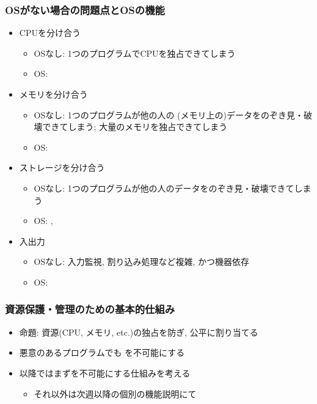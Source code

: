 \documentclass[12pt,dvipdfmx]{beamer}
\begin{document}
\begin{frame}
\frametitle{OSがない場合の問題点とOSの機能}
\begin{itemize}
\item CPUを分け合う
  \begin{itemize}
  \item OSなし: 1つのプログラムでCPUを独占できてしまう
  \item OS: 
  \end{itemize}
\item メモリを分け合う
  \begin{itemize}
  \item OSなし: 1つのプログラムが他の人の
    (メモリ上の)データをのぞき見・破壊できてしまう;
    大量のメモリを独占できてしまう
  \item OS: 
  \end{itemize}
\item ストレージを分け合う
  \begin{itemize}
  \item OSなし: 1つのプログラムが他の人のデータをのぞき見・破壊できてしまう
  \item OS: , 
  \end{itemize}
\item 入出力
  \begin{itemize}
  \item OSなし: 入力監視, 割り込み処理など複雑, かつ機器依存
  \item OS: 
  \end{itemize}
\end{itemize}
\end{frame}


\begin{frame}
  \frametitle{資源保護・管理のための基本的仕組み}
  \begin{itemize}
  \item 命題: 資源(CPU, メモリ, etc.)の独占を防ぎ, 公平に割り当てる
  \item 悪意のあるプログラムでも
    を不可能にする
  \item 以降ではまずを不可能にする仕組みを考える
    \begin{itemize}
    \item それ以外は次週以降の個別の機能説明にて
    \end{itemize}
  \end{itemize}
\end{frame}
\end{document}
